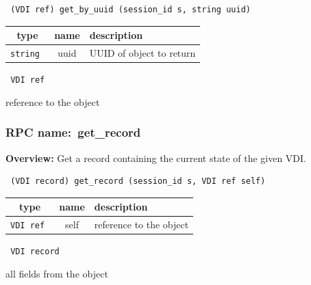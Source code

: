 \begin{verbatim} (VDI ref) get_by_uuid (session_id s, string uuid)\end{verbatim}



 
\vspace{0.3cm}
\begin{tabular}{|c|c|p{7cm}|}
 \hline
{\bf type} & {\bf name} & {\bf description} \\ \hline
{\tt string } & uuid & UUID of object to return \\ \hline 

\end{tabular}

\vspace{0.3cm}

{\tt 
VDI ref
}


reference to the object
\vspace{0.3cm}
\vspace{0.3cm}
\vspace{0.3cm}
\subsubsection{RPC name:~get\_record}

{\bf Overview:} 
Get a record containing the current state of the given VDI.

\begin{verbatim} (VDI record) get_record (session_id s, VDI ref self)\end{verbatim}



 
\vspace{0.3cm}
\begin{tabular}{|c|c|p{7cm}|}
 \hline
{\bf type} & {\bf name} & {\bf description} \\ \hline
{\tt VDI ref } & self & reference to the object \\ \hline 

\end{tabular}

\vspace{0.3cm}

{\tt 
VDI record
}


all fields from the object
\vspace{0.3cm}
\vspace{0.3cm}
\vspace{0.3cm}
